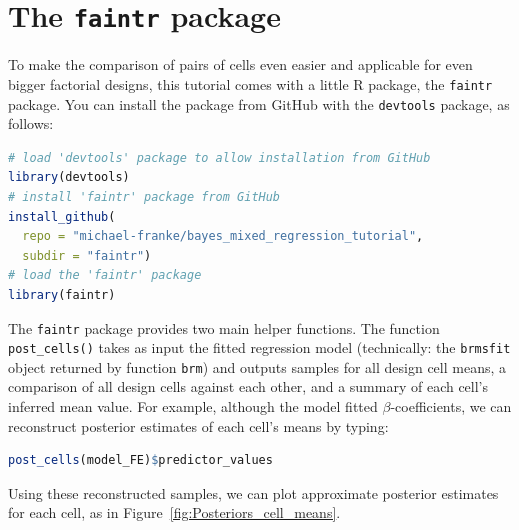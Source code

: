 \documentclass[nobib]{tufte-handout}
\begin{document}
\section{The \texttt{faintr} package}

To make the comparison of pairs of cells even easier and applicable for even bigger factorial designs, this tutorial comes with a little R package, the \texttt{faintr} package.
%
%
You can install the package from GitHub with the \texttt{devtools} package, as follows:

\medskip 

\begin{minipage}[]{1.3\textwidth}
\begin{lstlisting}[language=R]
# load 'devtools' package to allow installation from GitHub
library(devtools)
# install 'faintr' package from GitHub
install_github(
  repo = "michael-franke/bayes_mixed_regression_tutorial", 
  subdir = "faintr")
# load the 'faintr' package
library(faintr)
\end{lstlisting}
\end{minipage}

The \texttt{faintr} package provides two main helper functions.
%
%
The function \texttt{post\_cells()}
takes as input the fitted regression model (technically: the \texttt{brmsfit} object returned
by function \texttt{brm}) and outputs samples for all design cell means, a comparison of all
design cells against each other, and a summary of each cell's inferred mean value.
For example, although the model fitted $\beta$-coefficients, we can reconstruct posterior estimates of each cell's means by typing:

\begin{minipage}[]{1.3\textwidth}
\begin{lstlisting}[language=R]
post_cells(model_FE)$predictor_values
\end{lstlisting}
\end{minipage}

\vspace*{-0.5cm}

\noindent Using these reconstructed samples, we can plot approximate posterior estimates for each cell, as in Figure~\ref{fig:Posteriors_cell_means}.
\end{document}
